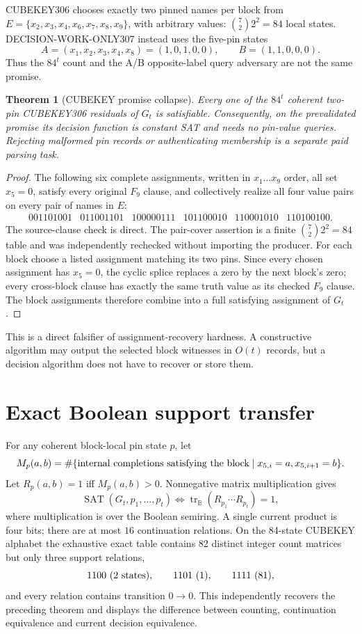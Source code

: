 \documentclass[11pt]{article}
\newtheorem{theorem}{Theorem}
\begin{document}
CUBEKEY306 chooses exactly two pinned names per block from
$E=\{x_2,x_3,x_4,x_6,x_7,x_8,x_9\}$, with arbitrary values: $\binom72 2^2=84$ local states.  DECISION-WORK-ONLY307 instead uses the five-pin states
\[
A=(x_1,x_2,x_3,x_4,x_8)=(1,0,1,0,0),\qquad
B=(1,1,0,0,0).
\]
Thus the $84^t$ count and the A/B opposite-label query adversary are not the same promise.

\begin{theorem}[CUBEKEY promise collapse]
Every one of the $84^t$ coherent two-pin CUBEKEY306 residuals of $G_t$ is satisfiable.  Consequently, on the prevalidated promise its decision function is constant SAT and needs no pin-value queries.  Rejecting malformed pin records or authenticating membership is a separate paid parsing task.
\end{theorem}
\begin{proof}
The following six complete assignments, written in $x_1\ldots x_9$ order, all set $x_5=0$, satisfy every original $F_9$ clause, and collectively realize all four value pairs on every pair of names in $E$:
\[
\begin{array}{cccccc}
001101001&011001101&100000111&101100010&110001010&110100100.
\end{array}
\]
The source-clause check is direct.  The pair-cover assertion is a finite $\binom72 2^2=84$ table and was independently rechecked without importing the producer.  For each block choose a listed assignment matching its two pins.  Since every chosen assignment has $x_5=0$, the cyclic splice replaces a zero by the next block's zero; every cross-block clause has exactly the same truth value as its checked $F_9$ clause.  The block assignments therefore combine into a full satisfying assignment of $G_t$.
\end{proof}

This is a direct falsifier of assignment-recovery hardness.  A constructive algorithm may output the selected block witnesses in $O(t)$ records, but a decision algorithm does not have to recover or store them.

\section{Exact Boolean support transfer}
For any coherent block-local pin state $p$, let
\[
 M_p(a,b)=\#\{\hbox{internal completions satisfying the block}\mid x_{5,i}=a, x_{5,i+1}=b\}.
\]
Let $R_p(a,b)=1$ iff $M_p(a,b)>0$.  Nonnegative matrix multiplication gives
\[
 \operatorname{SAT}(G_t,p_1,\ldots,p_t)
 \iff \operatorname{tr}_{\mathbb B}(R_{p_1}\cdots R_{p_t})=1,
\]
where multiplication is over the Boolean semiring.  A single current product is four bits; there are at most $16$ continuation relations.  On the 84-state CUBEKEY alphabet the exhaustive exact table contains 82 distinct integer count matrices but only three support relations,
\[
1100\ (2\hbox{ states}),\qquad1101\ (1),\qquad1111\ (81),
\]
and every relation contains transition $0\to0$.  This independently recovers the preceding theorem and displays the difference between counting, continuation equivalence and current decision equivalence.
\end{document}
